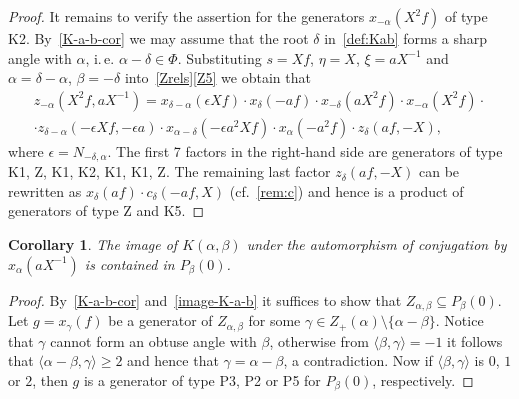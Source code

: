 \documentclass[10pt,a4paper,twoside]{article}
\newtheorem{corollary}[lemma]{Corollary}
\theoremstyle{remark}
\theoremstyle{definition}
\numberwithin{lemma}{section}
\numberwithin{prop}{section}
\numberwithin{corollary}{section}
\numberwithin{externaltheorem}{section}
\numberwithin{equation}{section}
\begin{document}
\begin{proof}
It remains to verify the assertion for the generators $x_{-\alpha}(X^2f) $ of type K2.
By~\cref{K-a-b-cor} we may assume that the root $\delta$ in~\cref{def:Kab} forms a sharp angle with $\alpha$, i.\,e. $\alpha-\delta \in \Phi$. Substituting $s = Xf$, $\eta = X$, $\xi = aX^{-1}$ and $\alpha = \delta-\alpha$, $\beta = -\delta$ into~\cref{Zrels}\ref{Z5} we obtain that
\begin{multline*} z_{-\alpha}(X^2f, aX^{-1}) = x_{\delta-\alpha}(\epsilon Xf) \cdot x_{\delta}(-af) \cdot x_{-\delta}(aX^2 f) \cdot x_{-\alpha}(X^2f) \cdot \\
 \cdot z_{\delta-\alpha}(-\epsilon Xf, -\epsilon a) \cdot x_{\alpha-\delta}(-\epsilon a^2 Xf) \cdot x_{\alpha}(- a^2 f) \cdot z_{\delta}(a f, -X), \end{multline*}
where $\epsilon = N_{-\delta,\alpha}$. 
The first 7 factors in the right-hand side are generators of type K1, Z, K1, K2, K1, K1, Z.
The remaining last factor $z_\delta(af, -X)$ can be rewritten as $x_{\delta}(af) \cdot c_{\delta}(-af, X)$ (cf.~\cref{rem:c}) and hence is a product of generators of type Z and K5. \end{proof}

\begin{corollary} \label{K-a-b-P-b} The image of $K(\alpha, \beta)$ under the automorphism of conjugation by $x_\alpha(aX^{-1})$ is contained in $P_\beta(0)$. \end{corollary}
\begin{proof} 
By~\cref{K-a-b-cor} and~\cref{image-K-a-b} it suffices to show that $Z_{\alpha, \beta} \subseteq P_\beta(0)$. Let $g = x_{\gamma}(f)$ be a generator of $Z_{\alpha, \beta}$ for some
$\gamma \in Z_+(\alpha) \setminus \{\alpha - \beta \}$. Notice that $\gamma$ cannot form an obtuse angle with $\beta$, otherwise from $\langle \beta, \gamma \rangle = -1$ it follows that $ \langle \alpha - \beta, \gamma \rangle \geq 2$ and hence that $\gamma = \alpha - \beta$, a contradiction.
Now if $\langle \beta, \gamma \rangle$ is $0$, $1$ or $2$, then $g$ is a generator of type P3, P2 or P5 for $P_\beta(0)$, respectively.\end{proof}
\end{document}
